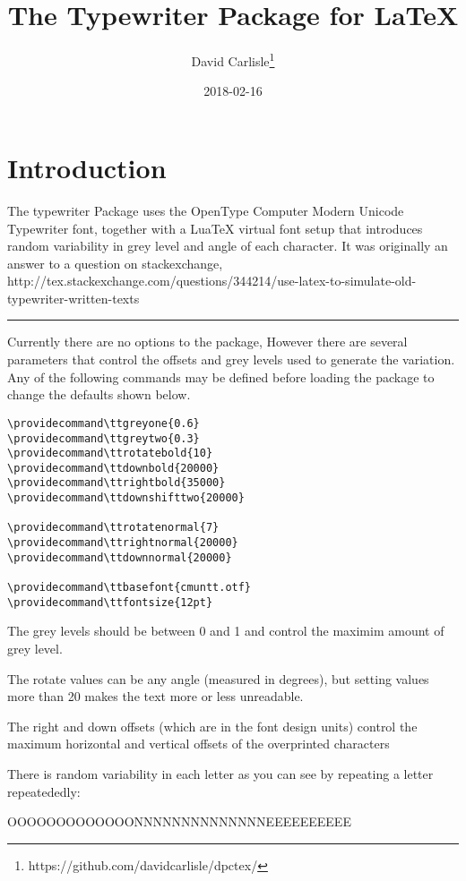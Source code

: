 \documentclass{article}
\begin{document}
\title{The Typewriter Package for LaTeX}
\author{David Carlisle\thanks{https://github.com/davidcarlisle/dpctex/}}
\date{2018-02-16}

\maketitle

\section{Introduction}
The typewriter Package uses the OpenType Computer Modern Unicode
Typewriter font, together with a LuaTeX virtual font setup that
introduces random variability in grey level and angle of each
character. It was originally an answer to a question on stackexchange,
http://tex.stackexchange.com/questions/344214/use-latex-to-simulate-old-typewriter-written-texts


\hrule

Currently there are no options to the package, However there are several parameters that control the offsets
and grey levels used to generate the variation. Any of the following
commands may be defined before loading the package to change the defaults shown below.

\begin{verbatim}
\providecommand\ttgreyone{0.6}
\providecommand\ttgreytwo{0.3}
\providecommand\ttrotatebold{10}
\providecommand\ttdownbold{20000}
\providecommand\ttrightbold{35000}
\providecommand\ttdownshifttwo{20000}

\providecommand\ttrotatenormal{7}
\providecommand\ttrightnormal{20000}
\providecommand\ttdownnormal{20000}

\providecommand\ttbasefont{cmuntt.otf}
\providecommand\ttfontsize{12pt}
\end{verbatim}

The grey levels should be between 0 and 1 and control the maximim
amount of grey level.

The rotate values can be any angle (measured in degrees), but setting
values more than 20 makes the text more or less unreadable.

The right and down offsets (which are in the font design units) control the
maximum horizontal and vertical offsets of the overprinted characters

There is random variability in each letter as you can see by repeating
a letter repeatededly:

OOOOOOOOOOOOONNNNNNNNNNNNNNEEEEEEEEEE
\end{document}

